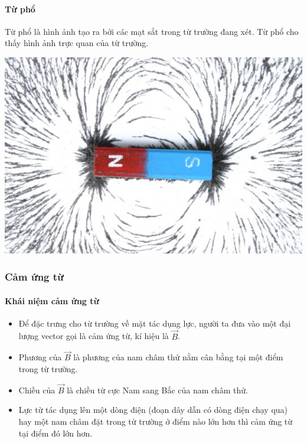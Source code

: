 \begin{tomtat}
	\paragraph{Từ phổ}
	\begin{dn}
		Từ phổ là hình ảnh tạo ra bởi các mạt sắt trong từ trường đang xét. Từ phổ cho thấy hình ảnh trực quan của từ trường.
	\end{dn}
	\begin{center}
		\includegraphics[width=0.4\linewidth]{figs/VN12-Y24-PH-SYL-017-2}
	\end{center}
	\subsubsection{Cảm ứng từ}
	\paragraph{Khái niệm cảm ứng từ}
	\begin{dn}
		\begin{itemize}
			\item Để đặc trưng cho từ trường về mặt tác dụng lực, người ta đưa vào một đại lượng vector gọi là cảm ứng từ, kí hiệu là $\vec{B}$. 
			\item Phương của $\vec{B}$ là phương của nam châm thử nằm cân bằng tại một điểm trong từ trường.
			\item Chiều của $\vec{B}$ là chiều từ cực Nam sang Bắc của nam châm thử.
			\item Lực từ tác dụng lên một dòng điện (đoạn dây dẫn có dòng điện chạy qua) hay một nam châm đặt trong từ trường ở điểm nào lớn hơn thì cảm ứng từ tại điểm đó lớn hơn.
		\end{itemize}
	\end{dn}
	

\end{tomtat}
